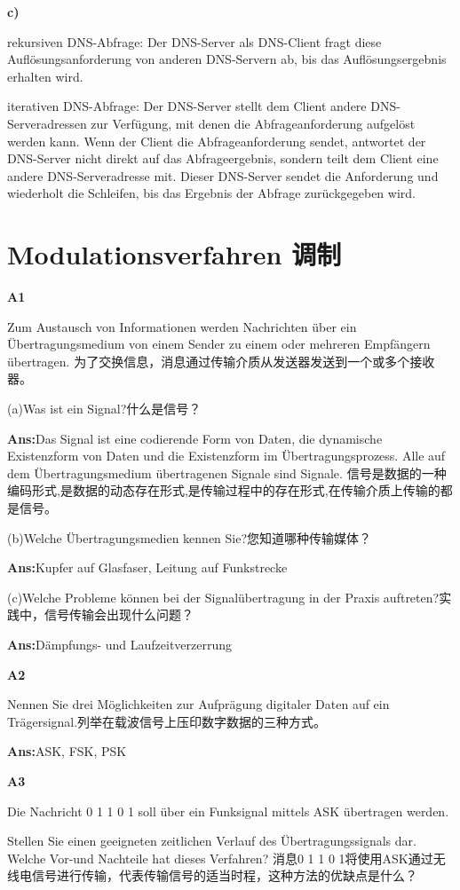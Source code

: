 \documentclass[fleqn]{article}
\begin{document}
\textbf{c)}

rekursiven DNS-Abfrage: Der DNS-Server als DNS-Client fragt diese Auflösungsanforderung von anderen DNS-Servern ab, bis das Auflösungsergebnis erhalten wird.

iterativen DNS-Abfrage: Der DNS-Server stellt dem Client andere DNS-Serveradressen zur Verfügung, mit denen die Abfrageanforderung aufgelöst werden kann. Wenn der Client die Abfrageanforderung sendet, antwortet der DNS-Server nicht direkt auf das Abfrageergebnis, sondern teilt dem Client eine andere DNS-Serveradresse mit. Dieser DNS-Server sendet die Anforderung und wiederholt die Schleifen, bis das Ergebnis der Abfrage zurückgegeben wird.

\clearpage
\section{Modulationsverfahren 调制}
\noindent\textbf{A1}

Zum Austausch von Informationen werden Nachrichten über ein Übertragungsmedium von einem Sender zu einem oder mehreren Empfängern übertragen.
为了交换信息，消息通过传输介质从发送器发送到一个或多个接收器。

(a)Was ist ein Signal?什么是信号？

\textbf{Ans:}Das Signal ist eine codierende Form von Daten, die dynamische Existenzform von Daten und die Existenzform im Übertragungsprozess. Alle auf dem Übertragungsmedium übertragenen Signale sind Signale.
信号是数据的一种编码形式,是数据的动态存在形式,是传输过程中的存在形式,在传输介质上传输的都是信号。

(b)Welche Übertragungsmedien kennen Sie?您知道哪种传输媒体？

\textbf{Ans:}Kupfer auf Glasfaser, Leitung auf Funkstrecke

(c)Welche Probleme können bei der Signalübertragung in der Praxis auftreten?实践中，信号传输会出现什么问题？

\textbf{Ans:}Dämpfungs- und Laufzeitverzerrung

\noindent\textbf{A2}

Nennen Sie drei Möglichkeiten zur Aufprägung digitaler Daten auf ein Trägersignal.列举在载波信号上压印数字数据的三种方式。

\textbf{Ans:}ASK, FSK, PSK

\noindent\textbf{A3}

Die Nachricht 0 1 1 0 1 soll über ein Funksignal mittels ASK übertragen werden.

Stellen Sie einen geeigneten zeitlichen Verlauf des Übertragungssignals dar. Welche Vor-und Nachteile hat dieses Verfahren?
消息0 1 1 0 1将使用ASK通过无线电信号进行传输，代表传输信号的适当时程，这种方法的优缺点是什么？
\end{document}
